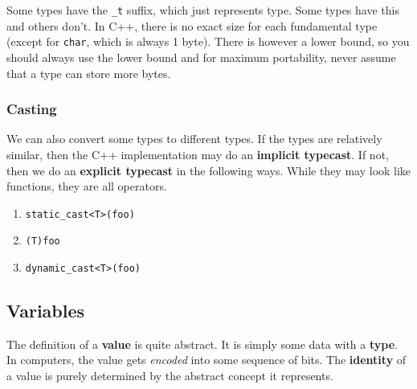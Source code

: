 \documentclass{article}
\begin{document}
    \begin{example}[]
      Some types have the \texttt{\_t} suffix, which just represents type. Some types have this and others don't. In C++, there is no exact size for each fundamental type (except for \texttt{char}, which is always 1 byte). There is however a lower bound, so you should always use the lower bound and for maximum portability, never assume that a type can store more bytes. 
    \end{example}

    \subsubsection{Casting}

      We can also convert some types to different types. If the types are relatively similar, then the C++ implementation may do an \textbf{implicit typecast}. If not, then we do an \textbf{explicit typecast} in the following ways. While they may look like functions, they are all operators. 
      \begin{enumerate}
        \item \texttt{static\_cast<T>(foo)}
        \item \texttt{(T)foo} 
        \item \texttt{dynamic\_cast<T>(foo)}
      \end{enumerate} 

  \subsection{Variables}

      \begin{definition}[Value]
        The definition of a \textbf{value} is quite abstract. It is simply some data with a \textbf{type}. In computers, the value gets \textit{encoded} into some sequence of bits. The \textbf{identity} of a value is purely determined by the abstract concept it represents. 
      \end{definition}
\end{document}
